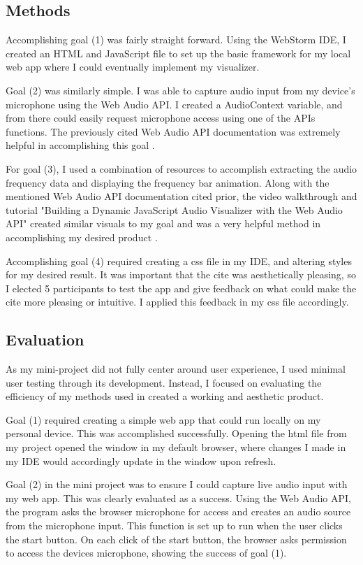 \documentclass[10pt,twocolumn]{article}
\begin{document}
\subsection{Methods}
Accomplishing goal (1) was fairly straight forward. Using the WebStorm IDE, I created an HTML and JavaScript file to set up the basic framework for my local web app where I could eventually implement my visualizer.

Goal (2) was similarly simple. I was able to capture audio input from my device's microphone using the Web Audio API. I created a AudioContext variable, and from there could easily request microphone access using one of the APIs functions. The previously cited Web Audio API documentation was extremely helpful in accomplishing this goal \cite{noauthor_web_2025}. 

For goal (3), I used a combination of resources to accomplish extracting the audio frequency data and displaying the frequency bar animation. Along with the mentioned Web Audio API documentation cited prior, the video walkthrough and tutorial "Building a Dynamic JavaScript Audio Visualizer with the Web Audio API" created similar visuals to my goal and was a very helpful method in accomplishing my desired product \cite{QuickCodingTuts}. 

Accomplishing goal (4) required creating a css file in my IDE, and altering styles for my desired result. It was important that the cite was aesthetically pleasing, so I elected 5 participants to test the app and give feedback on what could make the cite more pleasing or intuitive. I applied this feedback in my css file accordingly. 
\subsection{Evaluation}
As my mini-project did not fully center around user experience, I used minimal user testing through its development. Instead, I focused on evaluating the efficiency of my methods used in created a working and aesthetic product. 

Goal (1) required creating a simple web app that could run locally on my personal device. This was accomplished successfully. Opening the html file from my project opened the window in my default browser, where changes I made in my IDE would accordingly update in the window upon refresh. 

Goal (2) in the mini project was to ensure I could capture live audio input with my web app. This was  clearly evaluated as a success. Using the Web Audio API, the program asks the browser microphone for access and creates an audio source from the microphone input. This function is set up to run when the user clicks the start button. On each click of the start button, the browser asks permission to access the devices microphone, showing the success of goal (1).
\end{document}
